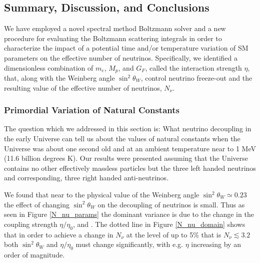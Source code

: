 
\subsection{Summary, Discussion, and Conclusions}\label{sec:concl}
We have employed a novel spectral method Boltzmann solver and a new procedure for evaluating the Boltzmann scattering integrals in order to characterize the impact of a potential time and/or temperature variation of SM parameters on the effective number of neutrinos. Specifically, we identified a dimensionless combination of $m_e$, $M_p$, and $G_F$, called the interaction strength $\eta$, that, along with the Weinberg angle $\sin^2 \theta_W$, control neutrino freeze-out and the resulting value of the effective number of neutrinos, $N_\nu$.  

\subsubsection{Primordial Variation of Natural Constants}
The question which we addressed in this section is: What neutrino decoupling in the early Universe can tell us about the values of natural constants when the Universe was about one second old and at an ambient temperature near to 1 MeV (11.6 billion degrees K). Our results were presented assuming that the Universe contains no other effectively massless particles but the three left handed neutrinos and corresponding, three right handed anti-neutrinos. 

We found that near to the physical value of the Weinberg angle  $\sin^2 \theta_W\simeq 0.23$ the effect of changing $\sin^2\theta_W$ on the decoupling of neutrinos is small. Thus as seen in Figure \ref{N_nu_params}  the dominant variance is due to the change  in the coupling strength $\eta/\eta_0$,   and . The dotted line in  Figure \ref{N_nu_domain} shows that in order to achieve a change in $N_\nu$ at the level of up to 5\% that is  $N_\nu\lesssim 3.2 $  both $\sin^2 \theta_W$ and $\eta/\eta_0$ must change significantly, with e.g. $\eta$ increasing by an order of magnitude.

